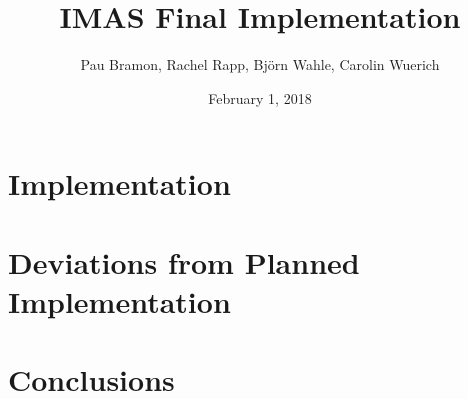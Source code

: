 \documentclass[11pt]{article}
\title{IMAS Final Implementation}
\begin{document}
\date{February 1, 2018}
\author{Pau Bramon, Rachel Rapp, Bj\"{o}rn Wahle, Carolin Wuerich}

\maketitle

\begin{abstract}	
	


\end{abstract}

\section{Implementation}\label{sec_implementation}





\section{Deviations from Planned Implementation}\label{sec_differences}



\section{Conclusions}\label{sec_conclusions}


\end{document}
